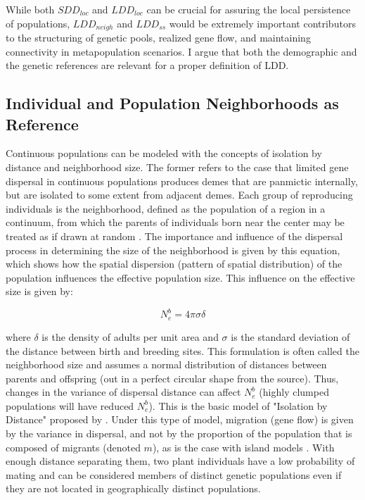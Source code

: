 \documentclass[a4paper, 12pt]{article}
\begin{document}
\begin{linenumbers}
While both $SDD_{loc}$ and $LDD_{loc}$ can be crucial for assuring the local persistence of populations, $LDD_{neigh}$ and $LDD_{ss}$ would be extremely important contributors to the structuring of genetic pools, realized gene flow, and maintaining connectivity in metapopulation scenarios. I argue that both the demographic and the genetic references are relevant for a proper definition of LDD.
 


\subsection*{Individual and Population Neighborhoods as Reference}

Continuous populations can be modeled with the concepts of isolation by distance and neighborhood size\citep{Wright:1943aa,Wright:1946aa}. The former refers to the case that limited gene dispersal in continuous populations produces demes that are panmictic internally, but are isolated to some extent from adjacent demes. Each group of reproducing individuals is the neighborhood, defined as the population of a region in a continuum, from which the parents of individuals born near the center may be treated as if drawn at random \citep{Wright:1969mb}. The importance and influence of the dispersal process in determining the size of the neighborhood is given by this equation, which shows how the spatial dispersion (pattern of spatial distribution) of the population influences the effective population size. This influence on the effective size is given by:  

\begin{equation}
					N^b_e= 4 \pi \sigma \delta
\end{equation}

where $\delta$ is the density of adults per unit area and $\sigma$ is the standard deviation of the distance between birth and breeding sites. This formulation is often called the neighborhood size and assumes a normal distribution of distances between parents and offspring (out in a perfect circular shape from the source). Thus, changes in the variance of dispersal distance can affect $N^b_e$ (highly clumped populations will have reduced $N^b_e$). This is the basic model of "Isolation by Distance" proposed by   \citet{Wright:1943aa,Wright:1946aa}. Under this type of model, migration (gene flow) is given by the variance in dispersal, and not by the proportion of the population that is composed of migrants (denoted $m$), as is the case with island models \citep{Slatkin:1985qb}. With enough distance separating them, two plant individuals have a low probability of mating and can be considered members of distinct genetic populations even if they are not located in geographically distinct populations.


\end{linenumbers}
\end{document}
